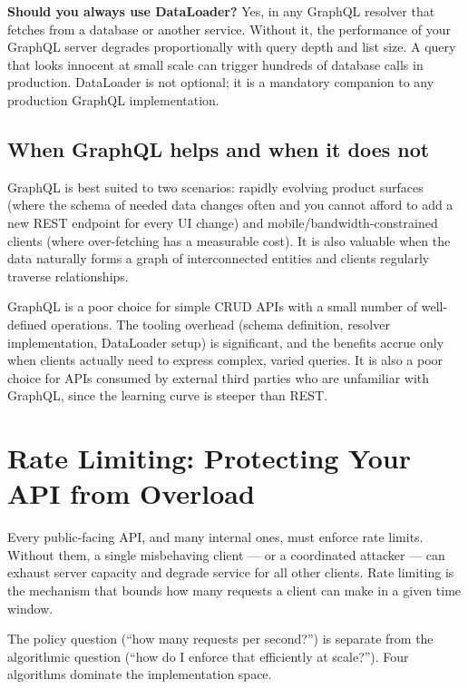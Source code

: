 \documentclass[11pt,a4paper]{article}
\begin{document}
\begin{thinkbox}
\textbf{Should you always use DataLoader?} Yes, in any GraphQL resolver that fetches from a database or another service. Without it, the performance of your GraphQL server degrades proportionally with query depth and list size. A query that looks innocent at small scale can trigger hundreds of database calls in production. DataLoader is not optional; it is a mandatory companion to any production GraphQL implementation.
\end{thinkbox}

\subsection{When GraphQL helps and when it does not}

GraphQL is best suited to two scenarios: rapidly evolving product surfaces (where the schema of needed data changes often and you cannot afford to add a new REST endpoint for every UI change) and mobile/bandwidth-constrained clients (where over-fetching has a measurable cost). It is also valuable when the data naturally forms a graph of interconnected entities and clients regularly traverse relationships.

GraphQL is a poor choice for simple CRUD APIs with a small number of well-defined operations. The tooling overhead (schema definition, resolver implementation, DataLoader setup) is significant, and the benefits accrue only when clients actually need to express complex, varied queries. It is also a poor choice for APIs consumed by external third parties who are unfamiliar with GraphQL, since the learning curve is steeper than REST.

\section{Rate Limiting: Protecting Your API from Overload}

Every public-facing API, and many internal ones, must enforce rate limits. Without them, a single misbehaving client --- or a coordinated attacker --- can exhaust server capacity and degrade service for all other clients. Rate limiting is the mechanism that bounds how many requests a client can make in a given time window.

The policy question (``how many requests per second?'') is separate from the algorithmic question (``how do I enforce that efficiently at scale?''). Four algorithms dominate the implementation space.
\end{document}
